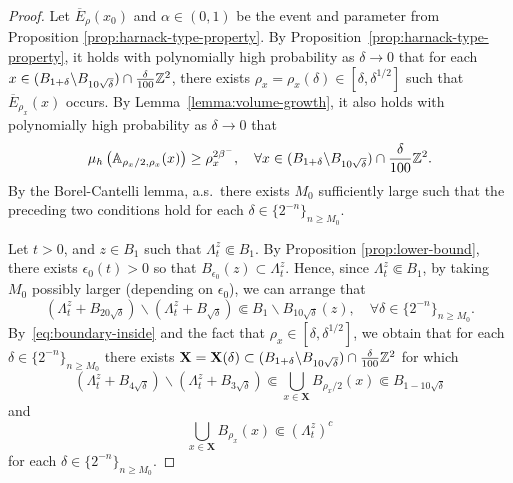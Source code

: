\documentclass[12pt]{amsart}
\numberwithin{equation}{section}
\newcommand{\cluster}[2]{\hyperref[eq:non-co-set]{\mathit{\Lambda}^{#1}_{#2}}}
\begin{document}
	\begin{proof}
		Let $\overline E_{\rho}(x_0)$ and $\alpha \in (0,1)$ be the event and parameter from Proposition \ref{prop:harnack-type-property}.
		By Proposition~\ref{prop:harnack-type-property}, it holds with polynomially high probability as $\delta \to 0$ that for each $x\in (B_{1 + \delta} \backslash B_{10 \sqrt{\delta}}) \cap \frac{\delta}{100} \mathbb{Z}^2$, there exists $\rho_x = \rho_x(\delta) \in [\delta,\delta^{1/2}]$ such that $\overline E_{\rho_x}(x)$ occurs. 
		By Lemma~\ref{lemma:volume-growth}, it also holds with polynomially high probability as $\delta \to 0$ that 
		\begin{equation} \label{eq:volume-growth-lower-bound}
		\mu_h\left( \mathbb{A}_{\rho_x/2, \rho_x}(x ) \right)  \geq \rho_x^{2 \beta^-}, \quad \forall x \in (B_{1 + \delta } \backslash B_{10 \sqrt{\delta }})  \cap \frac{\delta }{100} \mathbb{Z}^2 .
		\end{equation}
		By the Borel-Cantelli lemma, a.s.\ there exists $M_0$ sufficiently large such that the preceding two conditions hold for each $\delta \in \{2^{-n}\}_{n \geq M_0}$.
		
		
		
		
		Let $t > 0$, and $z \in B_1$ such that ${\cluster{z}{t}} \Subset B_1$. By Proposition \ref{prop:lower-bound}, there exists $\epsilon_0(t) > 0$ so that $B_{\epsilon_0}(z) \subset {\cluster{z}{t}}$.
		Hence, since ${\cluster{z}{t}} \Subset B_1$, by taking $M_0$ possibly larger (depending on $\epsilon_0$), we can arrange that
		\begin{equation} \label{eq:boundary-inside}
		({\cluster{z}{t}} + B_{20 \sqrt{\delta }}) \backslash ({\cluster{z}{t}} + B_{\sqrt{\delta }}) \Subset  B_1 \backslash B_{10 \sqrt{\delta }}(z), \quad \forall \delta  \in \{2^{-n}\}_{n \geq M_0} .
		\end{equation}
		By~\eqref{eq:boundary-inside} and the fact that $\rho_x \in [\delta , \delta^{1/2}]$, we obtain that for each $\delta  \in \{2^{-n}\}_{n \geq M_0}$ there exists $\mathbf{X} = \mathbf{X}(\delta) \subset (B_{1 + \delta } \backslash B_{10 \sqrt{\delta }})  \cap \frac{\delta }{100} \mathbb{Z}^2$ for which
		\begin{equation} \label{eq:cover-continuous}
		({\cluster{z}{t}} + B_{4 \sqrt{\delta }}) \backslash ({\cluster{z}{t}} + B_{3 \sqrt{\delta }}) \Subset \bigcup_{x \in \mathbf{X}} B_{\rho_x/2}(x ) \Subset B_{1- 10 \sqrt{\delta}}
		\end{equation}
		and 
		\begin{equation} \label{eq:cover-in-complement}
		\bigcup_{x \in \mathbf{X}} B_{\rho_x}(x) \Subset ({{{\cluster{z}{t}}}})^c
		\end{equation}
		for each $\delta  \in \{2^{-n}\}_{n \geq M_0}$.
		

\end{proof}
\end{document}
